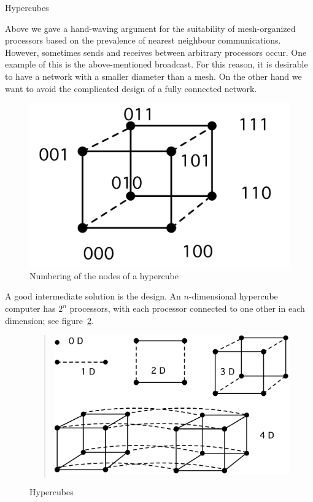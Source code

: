  {Hypercubes}
\label{sec:hypercube}

Above we gave a hand-waving argument for the suitability of
mesh-organized processors based on the prevalence of nearest
neighbour communications. However, sometimes sends and receives
between arbitrary processors occur. One example of this is the
above-mentioned broadcast. For this reason, it is desirable to have a
network with a smaller diameter than a mesh. On the other hand we want
to avoid the complicated design of a fully connected network.

\begin{figure}
  \includegraphics[scale=.081]{graphics/hypercubenumber}
  \caption{Numbering of the nodes of a hypercube}
  \label{fig:cubenumber}
\end{figure}
%
A good intermediate solution is the  design. An
$n$-dimensional hypercube computer has $2^n$ processors, with each
processor connected to one other in each dimension; see
figure~\ref{fig:hypercube}. 

\begin{figure}[t]
  \begin{quote}
  \includegraphics[scale=.12]{graphics/hypercubes}
  \end{quote}
  \caption{Hypercubes}
  \label{fig:hypercube}
\end{figure}

